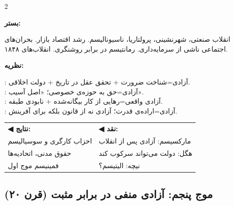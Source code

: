 \begin{tcolorbox}[mybox, title={موج چهارم | قرن نوزدهم | \lr{1800 -- 1914}},
  colframe=EraModern, colback=EraModern!5,
  boxed title style={colback=EraModern}]

\begin{multicols}{2}

\textbf{\color{EraModern}بستر:}

انقلاب صنعتی، شهرنشینی، پرولتاریا، ناسیونالیسم. رشد اقتصاد بازار. بحران‌های اجتماعی ناشی از سرمایه‌داری. رمانتیسم در برابر روشنگری. انقلاب‌های ۱۸۴۸.

\columnbreak

\textbf{\color{EraModern}نظریه:}

: آزادی=شناخت ضرورت + تحقق عقل در تاریخ + دولت اخلاقی.\\
: آزادی=حق به حوزه‌ی خصوصی؛ «اصل آسیب».\\
: آزادی واقعی=رهایی از کار بیگانه‌شده + نابودی طبقه.\\
: آزادی=اراده‌ی قدرت؛ آزادی نه از قانون بلکه برای آفرینش.

\end{multicols}

\vspace{0.3cm}
\begin{tabular}{p{5cm}p{5cm}}
\textcolor{AccentGreen}{\textbf{◀ نتایج:}} & \textcolor{AccentRed}{\textbf{◀ نقد:}} \\
احزاب کارگری و سوسیالیسم & مارکسیسم: آزادی پس از انقلاب \\
حقوق مدنی، اتحادیه‌ها & هگل: دولت می‌تواند سرکوب کند \\
فمینیسم موج اول & نیچه: الیتیسم؟ \\
\end{tabular}

\end{tcolorbox}

\subsection{موج پنجم: آزادی منفی در برابر مثبت (قرن ۲۰)}
\label{subsec:wave5}

